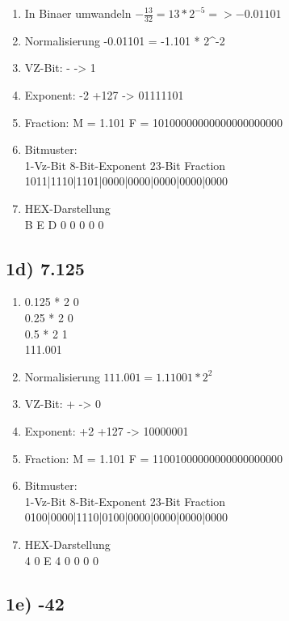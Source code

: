 \documentclass[]{article}
\providecommand{\tightlist}{%
  \setlength{\itemsep}{0pt}\setlength{\parskip}{0pt}}
\begin{document}
\begin{enumerate}
\tightlist
\item
  In Binaer umwandeln ${-\frac{13}{32}} = 13 * 2^{-5} => {-0.01101}	$
\item
  Normalisierung -0.01101 = -1.101 * 2\^{}-2
\item
  VZ-Bit: - -> 1
\item
  Exponent: -2 +127 -> 01111101
\item
  Fraction: M = 1.101 F = 10100000000000000000000
\item
  Bitmuster:\\
  1-Vz-Bit 8-Bit-Exponent 23-Bit Fraction\\
  1011|1110|1101|0000|0000|0000|0000|0000
\item
  HEX-Darstellung\\
  B E D 0 0 0 0 0
\end{enumerate}

\subsection{1d) 7.125}\label{d-7.125}

\begin{enumerate}
\tightlist
\item
  0.125 * 2 0\\
  0.25 * 2 0\\
  0.5 * 2 1\\
  111.001
\item
  Normalisierung $111.001 = 1.11001 * 2^{2}$
\item
  VZ-Bit: + -> 0
\item
  Exponent: +2 +127 -> 10000001
\item
  Fraction: M = 1.101 F = 11001000000000000000000
\item
  Bitmuster:\\
  1-Vz-Bit 8-Bit-Exponent 23-Bit Fraction\\
  0100|0000|1110|0100|0000|0000|0000|0000
\item
  HEX-Darstellung\\
  4 0 E 4 0 0 0 0
\end{enumerate}

\subsection{1e) -42}\label{e--42}
\end{document}
